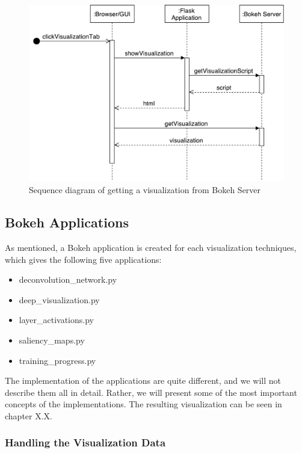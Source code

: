 \begin{figure}[h!]
    \centering
        \includegraphics[width=\textwidth]{fig/sequence-bokeh.pdf}
        \caption{Sequence diagram of getting a visualization from Bokeh Server}
        \label{bokeh-server}
\end{figure}

\subsection{Bokeh Applications}

As mentioned, a Bokeh application is created for each visualization techniques, which gives the following five applications:

\begin{itemize}
    \item deconvolution\_network.py
    \item deep\_visualization.py
    \item layer\_activations.py
    \item saliency\_maps.py
    \item training\_progress.py
\end{itemize}

\noindent The implementation of the applications are quite different, and we will not describe them all in detail. Rather, we will present some of the most important concepts of the implementations. The resulting visualization can be seen in chapter X.X.

\subsubsection{Handling the Visualization Data}

